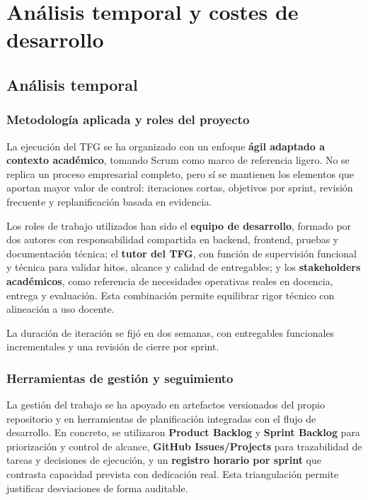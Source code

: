 \chapter{An\'alisis temporal y costes de desarrollo}\label{anatemporal}
\makeatletter
{}
\makeatother

\FloatBarrier
\section{An\'alisis temporal}
\subsection{Metodolog\'ia aplicada y roles del proyecto}

La ejecuci\'on del TFG se ha organizado con un enfoque \textbf{\'agil adaptado a contexto acad\'emico},
tomando Scrum como marco de referencia ligero.
No se replica un proceso empresarial completo,
pero s\'i se mantienen los elementos que aportan mayor valor de control:
iteraciones cortas, objetivos por sprint, revisi\'on frecuente y replanificaci\'on basada en evidencia.

Los roles de trabajo utilizados han sido el \textbf{equipo de desarrollo}, formado por dos autores con responsabilidad compartida en backend, frontend, pruebas y documentaci\'on t\'ecnica; el \textbf{tutor del TFG}, con funci\'on de supervisi\'on funcional y t\'ecnica para validar hitos, alcance y calidad de entregables; y los \textbf{stakeholders acad\'emicos}, como referencia de necesidades operativas reales en docencia, entrega y evaluaci\'on. Esta combinaci\'on permite equilibrar rigor t\'ecnico con alineaci\'on a uso docente.

La duraci\'on de iteraci\'on se fij\'o en dos semanas,
con entregables funcionales incrementales y una revisi\'on de cierre por sprint.

\subsection{Herramientas de gesti\'on y seguimiento}

La gesti\'on del trabajo se ha apoyado en artefactos versionados del propio repositorio y en herramientas de planificaci\'on integradas con el flujo de desarrollo. En concreto, se utilizaron \textbf{Product Backlog} y \textbf{Sprint Backlog} para priorizaci\'on y control de alcance, \textbf{GitHub Issues/Projects} para trazabilidad de tareas y decisiones de ejecuci\'on, y un \textbf{registro horario por sprint} que contrasta capacidad prevista con dedicaci\'on real. Esta triangulaci\'on permite justificar desviaciones de forma auditable.

